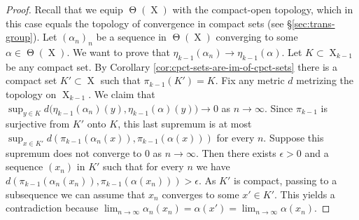 \documentclass[a4paper,12pt,reqno]{amsart}
\theoremstyle{definition}
\def\to{\rightarrow}
\DeclareMathOperator{\tran}{\Theta}
\DeclareMathOperator{\ns}{X}
\begin{document}
\begin{proof}
Recall that we equip $\tran(\ns)$ with the compact-open topology, which in this case equals the topology of convergence in compact sets (see \S \ref{sec:trans-group}). Let $(\alpha_n)_n$ be a sequence in $\tran(\ns)$ converging to some $\alpha\in \tran(\ns)$. We want to prove that $\eta_{k-1}(\alpha_n)\to \eta_{k-1}(\alpha)$. Let $K\subset \ns_{k-1}$ be any compact set. By Corollary \ref{cor:cpct-sets-are-im-of-cpct-sets} there is a compact set $K'\subset \ns$ such that $\pi_{k-1}(K')=K$. Fix any metric $d$ metrizing the topology on $\ns_{k-1}$. We claim  that $\sup_{y\in K}d\big(\eta_{k-1}(\alpha_n)(y),\eta_{k-1}(\alpha)(y)\big)\to 0$ as $n\to \infty$. Since $\pi_{k-1}$ is surjective from $K'$ onto $K$, this last supremum is at most $\sup_{x\in K'}d(\pi_{k-1}(\alpha_n(x)),\pi_{k-1}(\alpha(x)))$ for every $n$. Suppose this supremum does not converge to 0 as $n\to \infty$. Then there exists $\epsilon>0$ and a sequence $(x_n)$ in $K'$ such that for every $n$ we have $d(\pi_{k-1}(\alpha_n(x_n)),\pi_{k-1}(\alpha(x_n)))>\epsilon$. As $K'$ is compact, passing to a subsequence we can assume that $x_n$ converges to some $x'\in K'$. This yields a contradiction because $\lim_{n\to\infty}\alpha_n(x_n)=\alpha(x')=\lim_{n\to\infty} \alpha(x_n)$.
\end{proof}
\end{document}
